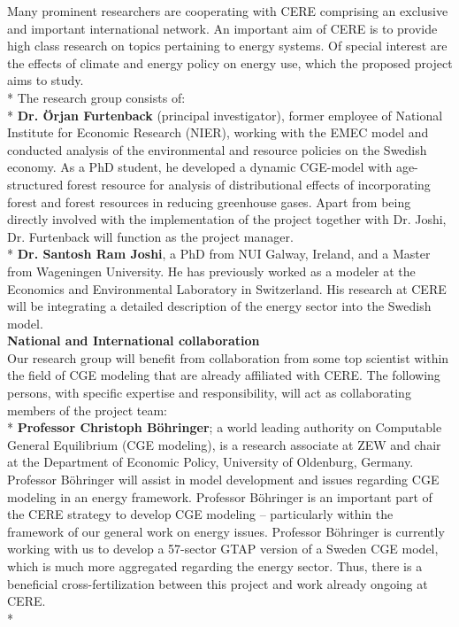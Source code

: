 Many prominent researchers are cooperating with CERE comprising an exclusive and important international network. An important aim of CERE is to provide high class research on topics pertaining to energy systems. Of special interest are the effects of climate and energy policy on energy use, which the proposed project aims to study.\\*
The research group consists of:\\*
\textbf{Dr. Örjan Furtenback} (principal investigator), former employee of National Institute for Economic Research (NIER), working with the EMEC model and conducted analysis of the environmental and resource policies on the Swedish economy. As a PhD student, he developed a dynamic CGE-model with age-structured forest resource for analysis of distributional effects of incorporating forest and forest resources in reducing greenhouse gases. Apart from being directly involved with the implementation of the project together with Dr. Joshi, Dr. Furtenback will function as the project manager.\\*
\textbf{Dr. Santosh Ram Joshi}, a PhD from NUI Galway, Ireland, and a Master from Wageningen University. He has previously worked as a modeler at the Economics and Environmental Laboratory in Switzerland. His research at CERE will be integrating a detailed description of the energy sector into the Swedish model.\\
\textbf{National and International collaboration}\\
Our research group will benefit from collaboration from some top scientist within the field of CGE modeling that are already affiliated with CERE. The following persons, with specific expertise and responsibility, will act as collaborating members of the project team:\\*
\textbf{Professor Christoph Böhringer}; a world leading authority on Computable General Equilibrium (CGE modeling), is a research associate at ZEW and chair at the Department of Economic Policy, University of Oldenburg, Germany. Professor Böhringer will assist in model development and issues regarding CGE modeling in an energy framework. Professor Böhringer is an important part of the CERE strategy to develop CGE modeling – particularly within the framework of our general work on energy issues. Professor Böhringer is currently working with us to develop a 57-sector GTAP version of a Sweden CGE model, which is much more aggregated regarding the energy sector. Thus, there is a beneficial cross-fertilization between this project and work already ongoing at CERE.\\*
